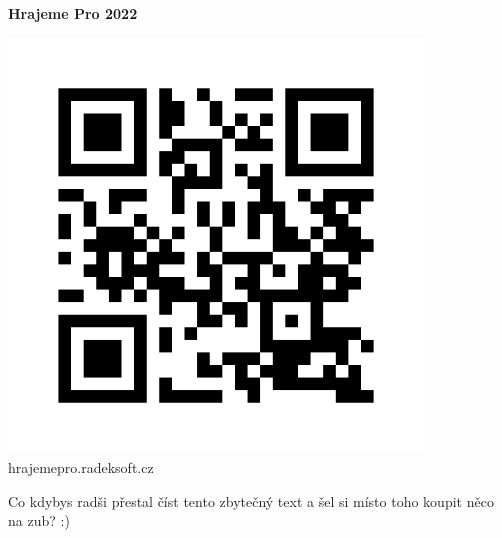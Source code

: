 \documentclass[a5paper]{article}
\begin{document}
    \begin{center}
        {\Huge \textbf{Hrajeme Pro 2022}}

        \includegraphics[width=11cm]{qr.png}
        {\large hrajemepro.radeksoft.cz}

        \vspace*{\fill}

        {\scriptsize Co kdybys radši přestal číst tento zbytečný text a šel si místo toho koupit něco na zub? :)}
    \end{center}
\end{document}
